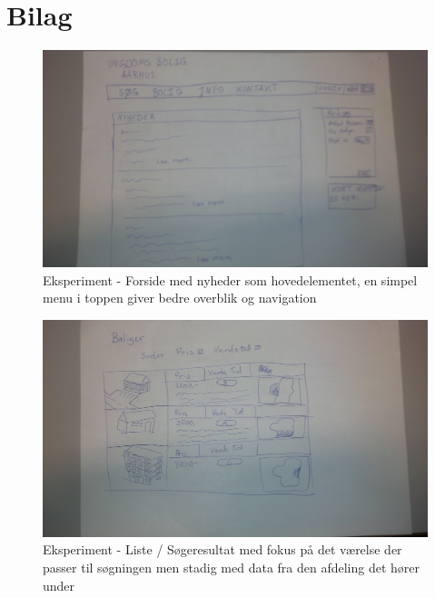 \documentclass[12pt, a4paper]{report}
\begin{document}
\listoffigures

\chapter{Bilag}

\begin{figure}[ht]
\includegraphics[width=\textwidth]{eksperiment_forside}
\caption{Eksperiment - Forside med nyheder som hovedelementet, en simpel menu i toppen giver bedre overblik og navigation}
\label{e_forside}
\end{figure}

\begin{figure}[ht]
\includegraphics[width=\textwidth]{eksperiment_liste}
\caption{Eksperiment - Liste / Søgeresultat med fokus på det værelse der passer til søgningen men stadig med data fra den afdeling det hører under}
\label{e_liste}
\end{figure}
\end{document}
